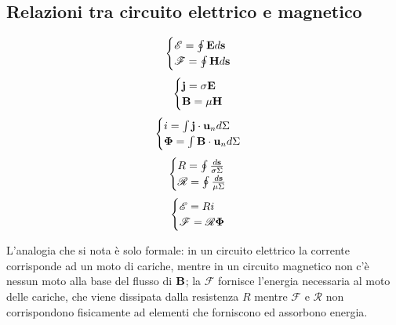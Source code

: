 \subsection{Relazioni tra circuito elettrico e magnetico}
\begin{equation}\begin{split}
\begin{cases}
\mathcal{E}=\oint{\mathbf{E} d\mathbf{s}}\\
\mathcal{F}=\oint{\mathbf{H} d\mathbf{s}}
\end{cases}
\end{split}\end{equation}
\begin{equation}\begin{split}
\begin{cases}
\mathbf{j}=\sigma\mathbf{E}\\
\mathbf{B}=\mu\mathbf{H}
\end{cases}
\end{split}\end{equation}
\begin{equation}\begin{split}
\begin{cases}
i=\int{\mathbf{j}\cdot\mathbf{u}_nd\Sigma}\\
\mathbf{\Phi}=\int{\mathbf{B}\cdot \mathbf{u}_nd\Sigma}
\end{cases}
\end{split}\end{equation}
\begin{equation}\begin{split}
\begin{cases}
R=\oint{\frac{ d\mathbf{s}}{\sigma\Sigma}}\\
\mathcal{R}=\oint{\frac{ d\mathbf{s}}{\mu\Sigma}}
\end{cases}
\end{split}\end{equation}
\begin{equation}\begin{split}
\begin{cases}
\mathcal{E}=Ri\\
\mathcal{F}=\mathcal{R}\mathbf{\Phi}
\end{cases}
\end{split}\end{equation}

L'analogia che si nota è solo formale: in un circuito elettrico la corrente corrisponde ad un moto di cariche, mentre in un circuito magnetico non c'è nessun moto alla base del flusso di $\mathbf{B}$; la $\mathcal{F}$ fornisce l'energia necessaria al moto delle cariche, che viene dissipata dalla resistenza $R$ mentre $\mathcal{F}$ e $\mathcal{R}$ non corrispondono fisicamente ad elementi che forniscono ed assorbono energia.

